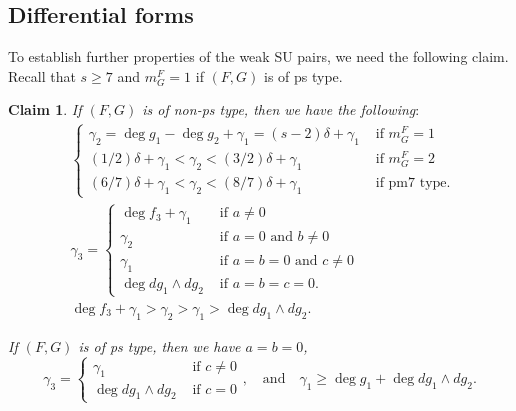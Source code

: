 \documentclass{amsart}
\theoremstyle{plain}
\newtheorem{claim}{Claim}
\theoremstyle{definition}
\newcommand{\nd}{\noindent}
\begin{document}
\subsection{Differential forms}\label{subsect:dodf}


To establish further properties of the weak SU pairs, 
we need the following claim. 
Recall that $s\ge 7$ and $m_G^F=1$ 
if $(F,G)$ is of ps type. 



\begin{claim}\label{claim:G}
\nd{\rm (i)} 
If $(F,G)$ is of non-ps type, 
then we have the following$:$ 
\begin{align}
&\left\{
\begin{array}{ll}
\gamma _2=\deg g_1-\deg g_2+\gamma _1=(s-2)\delta +\gamma _1
& \text{ if \ }m_G^F=1 \\
(1/2)\delta +\gamma _1<\gamma _2<(3/2)\delta +\gamma _1
& \text{ if \ }m_G^F=2 \\
(6/7)\delta+\gamma _1<\gamma _2<(8/7)\delta +\gamma _1
&  \text{ if \ pm7 type. } 
\end{array}
\right.
\label{eq:pfSUred5.5 p}  \\
&\gamma _3 =\left\{
\begin{array}{cl}
\deg f_3+\gamma _1
& \text{ if }a\neq 0 \\
\gamma _2 & \text{ if }a=0\text{ and }b\neq 0 \\
\gamma _1 & \text{ if }a=b=0\text{ and }c\neq 0 \\
\deg dg_1\wedge dg_2 & \text{ if }a=b=c=0.  
\end{array}
\right. \label{eq:P12-1}\\
&\deg f_3+\gamma _1>
\gamma _2
>\gamma _1>\deg dg_1\wedge dg_2. 
\label{eq:gamma order}
\end{align}


\nd \nd{\rm (ii)} 
If $(F,G)$ is of ps type, 
then we have $a=b=0$, 
\begin{equation}\label{eq:P12-1 ps}
\gamma _3 =\left\{
\begin{array}{cl}
\gamma _1 & \text{ if }
c\neq 0 \\
\deg dg_1\wedge dg_2 & \text{ if }
c=0  
\end{array},
\right. 
\quad \text{and}\quad 
\gamma _1\ge \deg g_1+\deg dg_1\wedge dg_2. 
\end{equation}
\end{claim}
\end{document}
